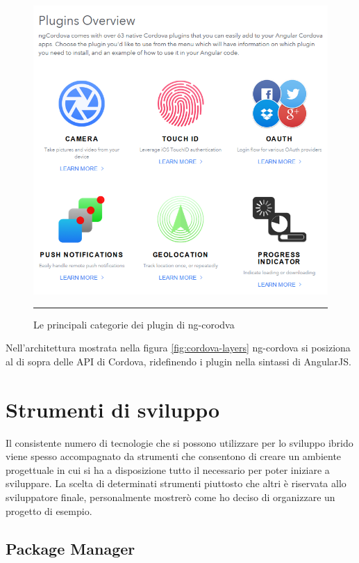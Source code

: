 \begin{figure}[!h]
  \centering
    \includegraphics[scale=0.66]{Figures/ngcordova-plugins.png} 
    \rule{35em}{0.5pt}
  \caption[ngCordova Plugin]{Le principali categorie dei plugin di ng-corodva}
  \label{fig:ngcordova-plugins}
\end{figure}

Nell'architettura mostrata nella figura \ref{fig:cordova-layers} ng-cordova si posiziona al di sopra delle API di Cordova, ridefinendo i plugin nella sintassi di AngularJS. 

\section{Strumenti di sviluppo}

Il consistente numero di tecnologie che si possono utilizzare per lo sviluppo ibrido viene spesso accompagnato da strumenti che consentono di creare un ambiente progettuale in cui si ha a disposizione tutto il necessario per poter iniziare a sviluppare. La scelta di determinati strumenti piuttosto che altri è riservata allo sviluppatore finale, personalmente mostrerò come ho deciso di organizzare un progetto di esempio.

\subsection{Package Manager}

